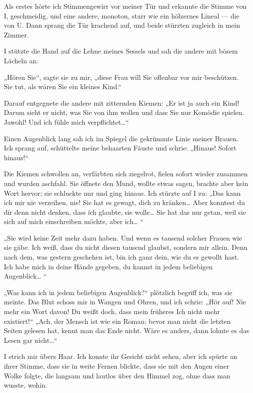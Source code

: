 Als erstes hörte ich Stimmengewirr vor meiner Tür und erkannte die
Stimme von I, geschmeidig, und eine andere, monoton, starr wie ein
hölzernes Lineal — die von U. Dann sprang die Tür krachend auf, und
beide stürzten zugleich in mein Zimmer.

I stützte die Hand auf die Lehne meines Sessels und sah die andere
mit bösem Lächeln an:

„Hören Sie“, sagte sie zu mir, „diese Frau will Sie offenbar vor
mir beschützen. Sie tut, als wären Sie ein kleines Kind.“

Darauf entgegnete die andere mit zitternden Kiemen: „Er ist ja auch
ein Kind! Darum sieht er nicht, was Sie von ihm wollen und dass Sie
nur Komödie spielen. Jawohl! Und ich fühle mich verpflichtet\ldots{}“

Einen Augenblick lang sah ich im Spiegel die gekrümmte Linie meiner
Brauen. Ich sprang auf, schüttelte meine behaarten Fäuste und
schrie: „Hinaus! Sofort hinaus!“

Die Kiemen schwollen an, verfärbten sich ziegelrot, fielen sofort
wieder zusammen und wurden aschfahl. Sie öffnete den Mund, wollte
etwas sagen, brachte aber kein Wort hervor; sie schluckte nur und
ging hinaus. Ich stürzte auf I zu: „Das kann ich mir nie verzeihen,
nie! Sie hat es gewagt, dich zu kränken\ldots{} Aber konntest du dir
denn nicht denken, dass ich glaubte, sie wolle\ldots{} Sie hat das nur
getan, weil sie sich auf mich einschreiben möchte, aber ich\ldots{} “

„Sie wird keine Zeit mehr dazu haben. Und wenn es tausend solcher
Frauen wie sie gäbe. Ich weiß, dass du nicht diesen tausend
glaubst, sondern mir allein. Denn nach dem, was gestern geschehen
ist, bin ich ganz dein, wie du es gewollt hast. Ich habe mich in
deine Hände gegeben, du kannst in jedem beliebigen Augenblick\ldots{} “

„Was kann ich in jedem beliebigen Augenblick?“ plötzlich begriff
ich, was sie meinte. Das Blut schoss mir in Wangen und Ohren, und
ich schrie: „Hör auf! Nie mehr ein Wort davon! Du weißt doch, dass
mein früheres Ich nicht mehr existiert!“ „Ach, der Mensch ist wie
ein Roman; bevor man nicht die letzten Seiten gelesen hat, kennt
man das Ende nicht. Wäre es anders, dann lohnte es das Lesen gar
nicht\ldots{}“

I strich mir übers Haar. Ich konnte ihr Gesicht nicht sehen, aber
ich spürte an ihrer Stimme, dass sie in weite Fernen blickte, dass
sie mit den Augen einer Wolke folgte, die langsam und lautlos über
den Himmel zog, ohne dass man wusste, wohin.

